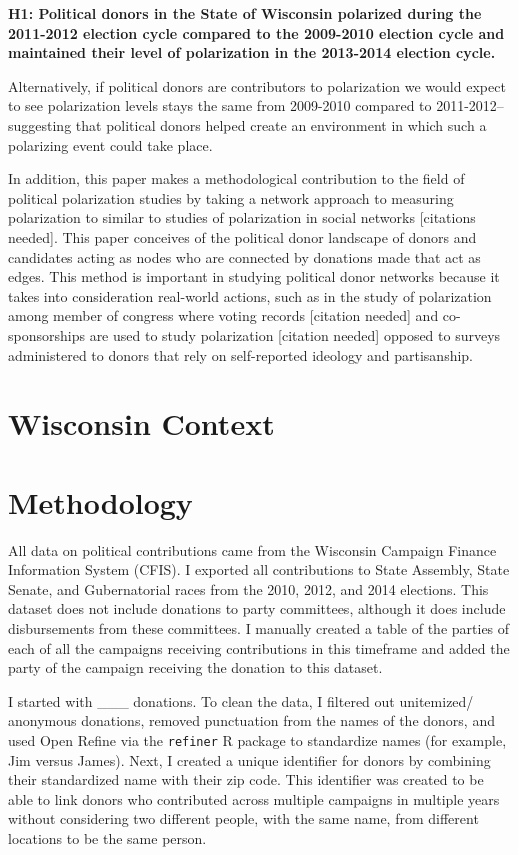 \documentclass[11pt,]{article}
\begin{document}
\textbf{H1: Political donors in the State of Wisconsin polarized during
the 2011-2012 election cycle compared to the 2009-2010 election cycle
and maintained their level of polarization in the 2013-2014 election
cycle.}

Alternatively, if political donors are contributors to polarization we
would expect to see polarization levels stays the same from 2009-2010
compared to 2011-2012--suggesting that political donors helped create an
environment in which such a polarizing event could take place.

In addition, this paper makes a methodological contribution to the field
of political polarization studies by taking a network approach to
measuring polarization to similar to studies of polarization in social
networks {[}citations needed{]}. This paper conceives of the political
donor landscape of donors and candidates acting as nodes who are
connected by donations made that act as edges. This method is important
in studying political donor networks because it takes into consideration
real-world actions, such as in the study of polarization among member of
congress where voting records {[}citation needed{]} and co-sponsorships
are used to study polarization {[}citation needed{]} opposed to surveys
administered to donors that rely on self-reported ideology and
partisanship.

\hypertarget{wisconsin-context}{%
\section{Wisconsin Context}\label{wisconsin-context}}

\hypertarget{methodology}{%
\section{Methodology}\label{methodology}}

All data on political contributions came from the Wisconsin Campaign
Finance Information System (CFIS). I exported all contributions to State
Assembly, State Senate, and Gubernatorial races from the 2010, 2012, and
2014 elections. This dataset does not include donations to party
committees, although it does include disbursements from these
committees. I manually created a table of the parties of each of all the
campaigns receiving contributions in this timeframe and added the party
of the campaign receiving the donation to this dataset.

I started with \_\_\_ donations. To clean the data, I filtered out
unitemized/ anonymous donations, removed punctuation from the names of
the donors, and used Open Refine via the \texttt{refiner} R package to
standardize names (for example, Jim versus James). Next, I created a
unique identifier for donors by combining their standardized name with
their zip code. This identifier was created to be able to link donors
who contributed across multiple campaigns in multiple years without
considering two different people, with the same name, from different
locations to be the same person.
\end{document}
